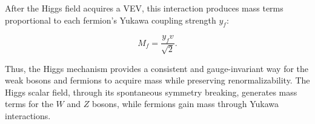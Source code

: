 After the Higgs field acquires a VEV, this interaction produces mass terms proportional to each fermion's Yukawa coupling strength \( y_f \):

\begin{equation}
\label{eq:higgsfermmass}
M_f = \frac{y_f v}{\sqrt{2}}.
\end{equation}

Thus, the Higgs mechanism provides a consistent and gauge-invariant way for the weak bosons and fermions to acquire mass while preserving renormalizability. The Higgs scalar field, through its spontaneous symmetry breaking, generates mass terms for the \( W \) and \( Z \) bosons, while fermions gain mass through Yukawa interactions. 















